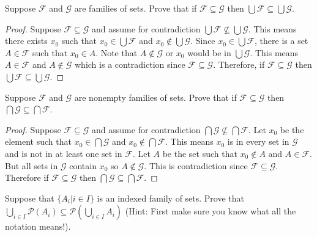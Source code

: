 \begin{tcolorbox}[title=Problem 12, breakable]
    Suppose $\mathcal{F}$ and $\mathcal{G}$ are families of sets. Prove that if
    $\mathcal{F} \subseteq  \mathcal{G}$ then $\bigcup \mathcal{F} \subseteq \bigcup \mathcal{G}$. 
\end{tcolorbox}

\begin{proof}
    Suppose $\mathcal{F} \subseteq \mathcal{G}$
    and assume for contradiction $\bigcup \mathcal{F} \not \subseteq \bigcup \mathcal{G}$.
    This means there exists $x_0$
    such that $x_0 \in \bigcup \mathcal{F}$ and $x_0 \not \in \bigcup \mathcal{G}$. 
    Since $x_0 \in \bigcup \mathcal{F}$, there is a set $A \in \mathcal{F}$ such that $x_0 \in A$.
    Note that $A \not \in \mathcal{G}$ or $x_0$ would be in $\bigcup{\mathcal{G}}$. This means
    $A \in \mathcal{F}$ and $A \not \in \mathcal{G}$ which is a contradiction since
    $\mathcal{F} \subseteq \mathcal{G}$. 
    Therefore, if $\mathcal{F} \subseteq  \mathcal{G}$ then $\bigcup \mathcal{F} \subseteq \bigcup \mathcal{G}$. 
\end{proof}

\begin{tcolorbox}[title=Problem 13, breakable]
    Suppose $\mathcal{F}$ and $\mathcal{G}$ are nonempty families of sets.
    Prove that if $\mathcal{F} \subseteq  \mathcal{G}$ then $\bigcap \mathcal{G} \subseteq  \bigcap \mathcal{F}$.
\end{tcolorbox}

\begin{proof}
    Suppose $\mathcal{F} \subseteq  \mathcal{G}$
    and assume for contradiction $\bigcap \mathcal{G} \not \subseteq \bigcap \mathcal{F}$.
    Let $x_0$ be the element such that $x_0 \in \bigcap \mathcal{G}$ and $x_0 \not \in \bigcap \mathcal{F}$.
    This means $x_0$ is in every set in $\mathcal{G}$ and is not in at least one set in $\mathcal{F}$.
    Let $A$ be the set such that $x_0 \not \in A$ and $A \in \mathcal{F}$.
    But all sets in $\mathcal{G}$ contain $x_0$ so $A \not \in \mathcal{G}$.
    This is contradiction since $\mathcal{F} \subseteq  \mathcal{G}$.
    Therefore if $\mathcal{F} \subseteq  \mathcal{G}$ then $\bigcap \mathcal{G} \subseteq  \bigcap \mathcal{F}$.
\end{proof}

\begin{tcolorbox}[title=Problem 14, breakable]
    Suppose that $\{A_i | i \in  I\}$ is an indexed family of
    sets. Prove that $\bigcup_{i \in I} \mathcal{P}(A_i) \subseteq \mathcal{P}(\bigcup_{i \in I} A_i)$
    (Hint: First make sure you know what all the notation means!).
\end{tcolorbox}

